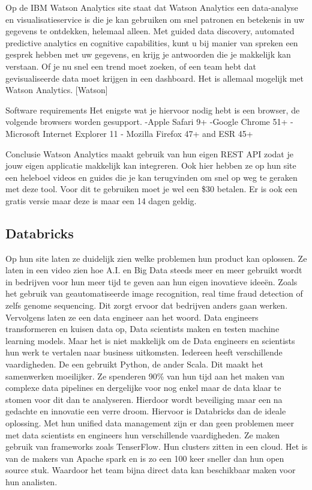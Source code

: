 Op de IBM Watson Analytics site staat dat Watson Analytics een data-analyse en visualisatieservice is die je kan gebruiken om snel patronen en betekenis in uw gegevens te ontdekken, helemaal alleen. Met guided data discovery, automated predictive analytics en cognitive capabilities, kunt u bij manier van spreken een gesprek hebben met uw gegevens, en krijg je antwoorden die je makkelijk kan verstaan. Of je nu snel een trend moet zoeken, of een team hebt dat gevisualiseerde data moet krijgen in een dashboard. Het is allemaal mogelijk met Watson Analytics.  [Watson]

Software requirements\newline
Het enigste wat je hiervoor nodig hebt is een browser, de volgende browsers worden gesupport.\newline
-Apple Safari 9+
-Google Chrome 51+
-Microsoft Internet Explorer 11
- Mozilla Firefox 47+ and ESR 45+

Conclusie
Watson Analytics maakt gebruik van hun eigen REST API zodat je jouw eigen applicatie makkelijk kan integreren. Ook hier hebben ze op hun site een heleboel videos en guides die je kan terugvinden om snel op weg te geraken met deze tool. Voor dit te gebruiken moet je wel een \$30 betalen. Er is ook een gratis versie maar deze is maar een 14 dagen geldig. 

\subsection{Databricks}
Op hun site laten ze duidelijk zien welke problemen hun product kan oplossen. Ze laten in een video zien hoe A.I. en Big Data steeds meer en meer gebruikt wordt in bedrijven voor hun meer tijd te geven aan hun eigen inovatieve ideeën. Zoals het gebruik van geautomatiseerde image recognition, real time fraud detection of zelfs genome sequencing. Dit zorgt ervoor dat bedrijven anders gaan werken. Vervolgens laten ze een data engineer aan het woord. Data engineers transformeren en kuisen data op, Data scientists maken en testen machine learning models. Maar het is niet makkelijk om de Data engineers en scientists hun werk te vertalen naar business uitkomsten. Iedereen heeft verschillende vaardigheden. De een gebruikt Python, de ander Scala. Dit maakt het samenwerken moeilijker. Ze spenderen 90\% van hun tijd aan het maken van complexe data pipelines en dergelijke voor nog enkel maar de data klaar te stomen voor dit dan te analyseren. Hierdoor wordt beveiliging maar een na gedachte en innovatie een verre droom. Hiervoor is Databricks dan de ideale oplossing. Met hun unified data management zijn er dan geen problemen meer met data scientists en engineers hun verschillende vaardigheden. Ze maken gebruik van frameworks zoals TenserFlow. Hun clusters zitten in een cloud. Het is van de makers van Apache spark en is zo een 100 keer sneller dan hun open source stuk. Waardoor het team bijna direct data kan beschikbaar maken voor hun analisten. 

